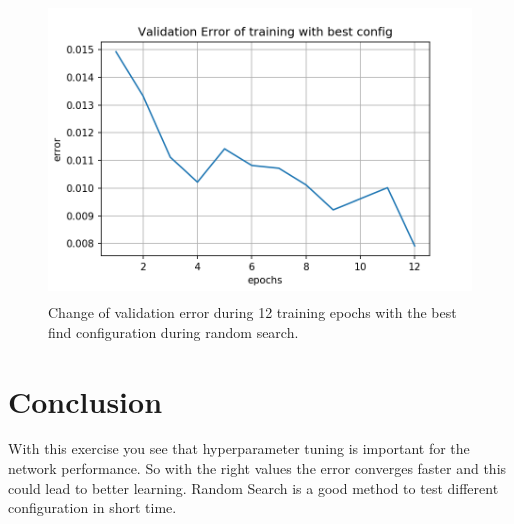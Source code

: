 \documentclass[a4paper,12pt]{article}
\begin{document}
\begin{figure}[H]
	\centering \includegraphics[width=11.70cm, height=7.9cm]{plots/rs/valid_error_12.png}
	\caption{
		\label{fig:rs_best}
		Change of validation error during 12 training epochs with the best find configuration during random search.
	}
\end{figure}

\section{Conclusion}

With this exercise you see that hyperparameter tuning is important for the network performance. So with the right values the error converges faster and this could lead to better learning. Random Search is a good method to test different configuration in short time.



\end{document}
